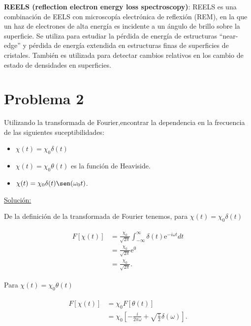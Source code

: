\documentclass[a4paper,11pt]{article}
\numberwithin{equation}{section}
\newcommand{\euler}{\mathrm{e}}
\begin{document}
\vspace{.3cm}

\textbf{REELS (reflection electron energy loss spectroscopy)}: REELS es una combinación 
de EELS con microscopía electrónica de reflexión (REM), en la que un haz de electrones 
de alta energía es incidente a un ángulo de brillo sobre la superficie. Se utiliza 
para estudiar la pérdida de energía de estructuras ``near-edge'' y pérdida de energía 
extendida en estructuras finas de superficies de cristales. También es 
utilizada para detectar cambios relativos en los cambio de estado de densidades 
en superficies.

\section{Problema 2}

Utilizando la transformada de Fourier,encontrar la dependencia en la frecuencia de las siguientes suceptibilidades:

\begin{itemize}
 \item $\chi(t) = \chi_0 \delta(t)$
 \item $\chi(t) = \chi_0\theta(t)$ es la función de Heaviside.
 \item $\chi(t) = \chi_0\delta(t)\sen(\omega_0 t)$.
\end{itemize}

\vspace{.3cm}

\underline{Solución:} \vspace{.3cm}

De la definición de la transformada de Fourier tenemos, para $\chi(t) = \chi_0 \delta(t)$ 

\begin{align}
\begin{split}
 F[\chi(t)] &= \frac{\chi_0}{\sqrt{2\pi}} \int_{-\infty}^\infty \delta(t) \euler^{-i 
 \omega t} dt \\
 &= \frac{\chi_0}{\sqrt{2\pi}}\euler^0 \\ 
 &= \frac{\chi_0}{\sqrt{2\pi}}.
\end{split}
\end{align}

Para $\chi(t) = \chi_0\theta(t)$

\begin{align}
 \begin{split}
  F[\chi(t)] &= \chi_0 F[\theta(t)] \\
  &= \chi_0\left[- \frac{i}{2\pi\omega} + \sqrt{\frac{\pi}{2}}\delta(\omega) \right].
 \end{split}
\end{align}
\end{document}
